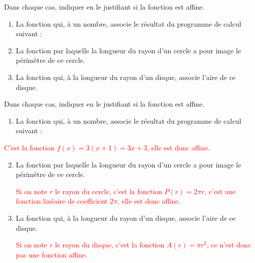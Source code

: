 \begin{exercice*}
    Dans chaque cas, indiquer en le justifiant si la fonction est affine.
    \begin{enumerate}
        \item La fonction qui, à un nombre, associe le résultat du programme de calcul suivant :
        
        \item La fonction par laquelle la longueur du rayon d'un cercle a pour image le périmètre de ce cercle.
        \item La fonction qui, à la longueur du rayon d'un disque, associe l'aire de ce disque.       
    \end{enumerate}
\end{exercice*}
\begin{corrige}
    Dans chaque cas, indiquer en le justifiant si la fonction est affine.

    \begin{enumerate}
        \item La fonction qui, à un nombre, associe le résultat du programme de calcul suivant :
    \end{enumerate}
            
        \textcolor{red}{C'est la fonction $f(x)=3(x+1)=3x+3$, elle est donc affine.}  
                  
        \begin{enumerate}
            \setcounter{enumi}{1}
        \item La fonction par laquelle la longueur du rayon d'un cercle a pour image le périmètre de ce cercle.
        
        \textcolor{red}{Si on note $r$ le rayon du cercle, c'est la fonction $P(r)=2\pi r$, c'est une fonction linéaire de coefficient $2\pi$, elle est donc affine.}
        \item La fonction qui, à la longueur du rayon d'un disque, associe l'aire de ce disque.
        
        \textcolor{red}{Si on note $r$ le rayon du disque, c'est la fonction $A(r)=\pi r^2$, ce n'est donc pas une fonction affine.}
    \end{enumerate}
\end{corrige}
